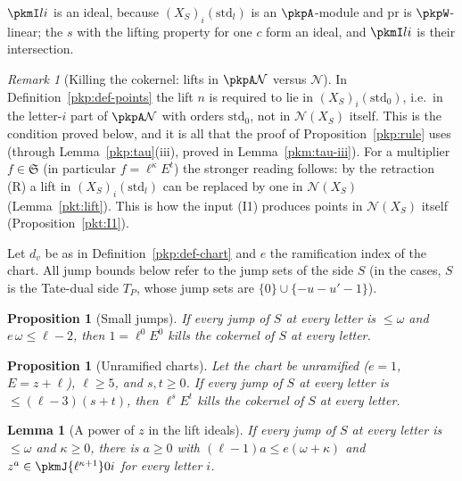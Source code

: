 \documentclass[10pt]{amsart}
\newtheorem{proposition}[theorem]{Proposition}
\newtheorem{lemma}[theorem]{Lemma}
\theoremstyle{definition}
\theoremstyle{remark}
\newtheorem{remark}[theorem]{Remark}
\begin{document}
$\pkmI li$ is an ideal, because $(X_S)_i(\mathrm{std}_l)$ is an $\pkpA$-module and $\mathrm{pr}$ is
$\pkpW$-linear; the $s$ with the lifting property for one $c$ form an ideal, and $\pkmI li$ is their
intersection.

\begin{remark}[Killing the cokernel: lifts in $\pkpA\mathcal N$ versus $\mathcal N$]\label{pkm:rem-kill}
In Definition~\ref{pkp:def-points} the lift $n$ is required to lie in $(X_S)_i(\mathrm{std}_0)$, i.e.\
in the letter-$i$ part of $\pkpA\mathcal N$ with orders $\mathrm{std}_0$, not in $\mathcal N(X_S)$
itself. This is the condition proved below, and it is all that the proof of
Proposition~\ref{pkp:rule} uses (through Lemma~\ref{pkp:tau}(iii), proved in
Lemma~\ref{pkm:tau-iii}). For a multiplier $f\in\mathfrak S$ (in particular $f=\ell^\kappa E^t$) the
stronger reading follows: by the retraction (R) a lift in $(X_S)_i(\mathrm{std}_l)$ can be replaced
by one in $\mathcal N(X_S)$ (Lemma~\ref{pkt:lift}). This is how the input (I1) produces points in
$\mathcal N(X_S)$ itself (Proposition~\ref{pkt:I1}).
\end{remark}

Let $d_v$ be as in Definition~\ref{pkp:def-chart} and $e$ the ramification index of the chart. All
jump bounds below refer to the jump sets of the side $S$ (in the cases, $S$ is the Tate-dual side
$T_P$, whose jump sets are $\{0\}\cup\{-u-u'-1\}$).

\begin{proposition}[Small jumps]\label{pkm:kill-small}
If every jump of $S$ at every letter is $\le\omega$ and $e\,\omega\le\ell-2$, then $1=\ell^0E^0$ kills
the cokernel of $S$ at every letter.
\end{proposition}

\begin{proposition}[Unramified charts]\label{pkm:kill-unram}
Let the chart be unramified ($e=1$, $E=z+\ell$), $\ell\ge5$, and $s,t\ge0$. If every jump of $S$ at
every letter is $\le(\ell-3)(s+t)$, then $\ell^sE^t$ kills the cokernel of $S$ at every letter.
\end{proposition}

\begin{lemma}[A power of $z$ in the lift ideals]\label{pkm:zpow}
If every jump of $S$ at every letter is $\le\omega$ and $\kappa\ge0$, there is $a\ge0$ with
$(\ell-1)a\le e(\omega+\kappa)$ and $z^a\in\pkmJ{\ell^{\kappa+1}}0i$ for every letter $i$.
\end{lemma}
\end{document}
